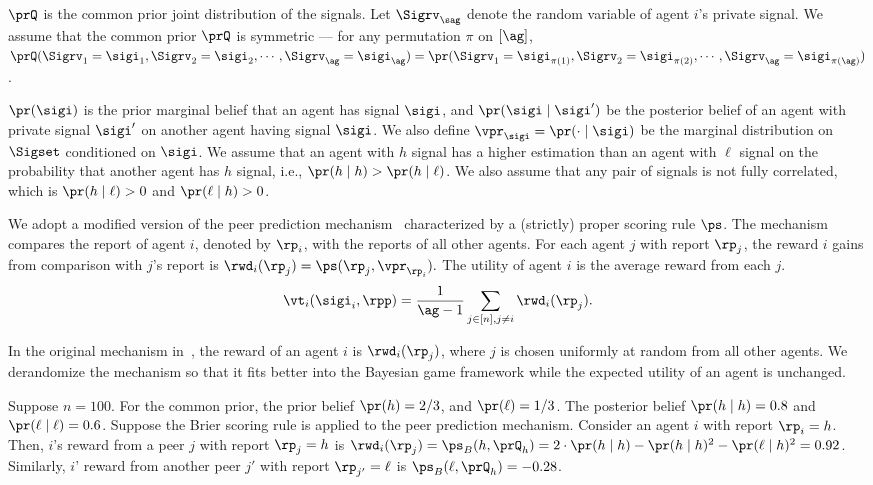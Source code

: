 $\prQ$ is the common prior joint distribution of the signals. Let $\Sigrv_{\sag}$ denote the random variable of agent $i$'s private signal.
We assume that the common prior $\prQ$ is symmetric --- for any permutation $\pi$ on $[\ag]$, $\prQ(\Sigrv_1=\sigi_1, \Sigrv_2 = \sigi_2,\cdots, \Sigrv_\ag = \sigi_\ag)=\pr(\Sigrv_1=\sigi_{\pi(1)}, \Sigrv_2 = \sigi_{\pi(2)},\cdots, \Sigrv_\ag = \sigi_{\pi(\ag)})$. 

$\pr(\sigi)$ is the prior marginal belief that an agent has signal $\sigi$, and $\pr(\sigi \mid \sigi')$ be the posterior belief of an agent with private signal $\sigi'$ on another agent having signal $\sigi$. We also define $\vpr_{\sigi} = \pr(\cdot \mid \sigi)$ be the marginal distribution on $\Sigset$ conditioned on $\sigi$. We assume that an agent with $h$ signal has a higher estimation than an agent with $\ell$ signal on the probability that another agent has $h$ signal, i.e., $\pr(h\mid h) > \pr(h \mid \ell)$. We also assume that any pair of signals is not fully correlated, which is $\pr(h\mid \ell) > 0$ and $\pr(\ell \mid h) > 0$. 

We adopt a modified version of the peer prediction mechanism~\citep{Miller05:Eliciting} characterized by a (strictly) proper scoring rule $\ps$. The mechanism compares the report of agent $i$, denoted by $\rp_i$, with the reports of all other agents. For each agent $j$ with report $\rp_j$, the reward $i$ gains from comparison with $j$'s report is $\rwd_i(\rp_j) = \ps(\rp_j, \vpr_{\rp_i}).$
The utility of agent $i$ is the average reward from each $j$.
\begin{equation*}
    \vt_i(\sigi_i, \rpp) = \frac{1}{\ag-1}\sum_{j\in[n], j\neq i} \rwd_i(\rp_j). 
\end{equation*}
\begin{remark}
    In the original mechanism in~\citep{Miller05:Eliciting}, the reward of an agent $i$ is $\rwd_i(\rp_j)$, where $j$ is chosen uniformly at random from all other agents. We derandomize the mechanism so that it fits better into the Bayesian game framework while the expected utility of an agent is unchanged. 
\end{remark}

\begin{example}
    \label{ex:setting}
    Suppose $n = 100$. For the common prior, the prior belief $\pr(h) = 2/3$, and $\pr(\ell) = 1/3$. The posterior belief $\pr(h \mid h) = 0.8$ and $\pr(\ell \mid \ell) = 0.6$. Suppose the Brier scoring rule is applied to the peer prediction mechanism. Consider an agent $i$ with report $\rp_i = h$. Then, $i$'s reward from a peer $j$ with report $\rp_j = h$ is $\rwd_i(\rp_j) = \ps_B(h, \prQ_h) = 2\cdot \pr(h \mid h) - \pr(h\mid h)^2 - \pr(\ell \mid h)^2 = 0.92$. Similarly, $i$' reward from another peer $j'$ with report $\rp_{j'} = \ell$ is $\ps_B(\ell, \prQ_h) = -0.28$. 
\end{example}

